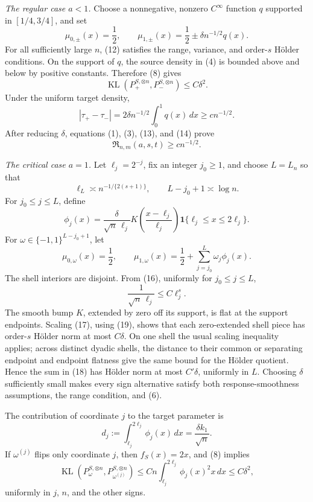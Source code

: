 \emph{The regular case \(a<1\).}
Choose a nonnegative, nonzero \(C^\infty\) function \(q\) supported in \([1/4,3/4]\), and set
\[
 \mu_{0,\pm}(x)=\frac12,
 \qquad
 \mu_{1,\pm}(x)=\frac12\pm\delta n^{-1/2}q(x).
\tag{12}
\]
For all sufficiently large \(n\), (12) satisfies the range, variance, and order-\(s\) H\"older conditions.  On the support of \(q\), the source density in (4) is bounded above and below by positive constants.  Therefore (8) gives
\[
 \operatorname{KL}(P_+^{S,\otimes n},P_-^{S,\otimes n})
 \le C\delta^2.
\tag{13}
\]
Under the uniform target density,
\[
 |\tau_+-\tau_-|
 =2\delta n^{-1/2}\int_0^1q(x)\,dx
 \ge c n^{-1/2}.
\tag{14}
\]
After reducing \(\delta\), equations (1), (3), (13), and (14) prove
\[
 \mathfrak R_{n,m}(a,s,t)\ge c n^{-1/2}.
\tag{15}
\]

\emph{The critical case \(a=1\).}
Let \(\ell_j=2^{-j}\), fix an integer \(j_0\ge1\), and choose \(L=L_n\) so that
\[
 \ell_L\asymp n^{-1/\{2(s+1)\}},
 \qquad
 L-j_0+1\asymp\log n.
\tag{16}
\]
For \(j_0\le j\le L\), define
\[
 \phi_j(x)=\frac{\delta}{\sqrt n\,\ell_j}
 K\!\left(\frac{x-\ell_j}{\ell_j}\right)
 \mathbf 1\{\ell_j\le x\le2\ell_j\}.
\tag{17}
\]
For \(\omega\in\{-1,1\}^{L-j_0+1}\), let
\[
 \mu_{0,\omega}(x)=\frac12,
 \qquad
 \mu_{1,\omega}(x)=\frac12+
 \sum_{j=j_0}^L\omega_j\phi_j(x).
\tag{18}
\]
The shell interiors are disjoint.  From (16), uniformly for \(j_0\le j\le L\),
\[
 \frac1{\sqrt n\,\ell_j}\le C\ell_j^s.
\tag{19}
\]
The smooth bump \(K\), extended by zero off its support, is flat at the support endpoints.  Scaling (17), using (19), shows that each zero-extended shell piece has order-\(s\) H\"older norm at most \(C\delta\).  On one shell the usual scaling inequality applies; across distinct dyadic shells, the distance to their common or separating endpoint and endpoint flatness give the same bound for the H\"older quotient.  Hence the sum in (18) has H\"older norm at most \(C'\delta\), uniformly in \(L\).  Choosing \(\delta\) sufficiently small makes every sign alternative satisfy both response-smoothness assumptions, the range condition, and (6).

The contribution of coordinate \(j\) to the target parameter is
\[
 d_j:=\int_{\ell_j}^{2\ell_j}\phi_j(x)\,dx
 =\frac{\delta k_1}{\sqrt n}.
\tag{20}
\]
If \(\omega^{(j)}\) flips only coordinate \(j\), then \(f_S(x)=2x\), and (8) implies
\[
 \operatorname{KL}(P_\omega^{S,\otimes n},
                    P_{\omega^{(j)}}^{S,\otimes n})
 \le Cn\int_{\ell_j}^{2\ell_j}\phi_j(x)^2x\,dx
 \le C\delta^2,
\tag{21}
\]
uniformly in \(j\), \(n\), and the other signs.

